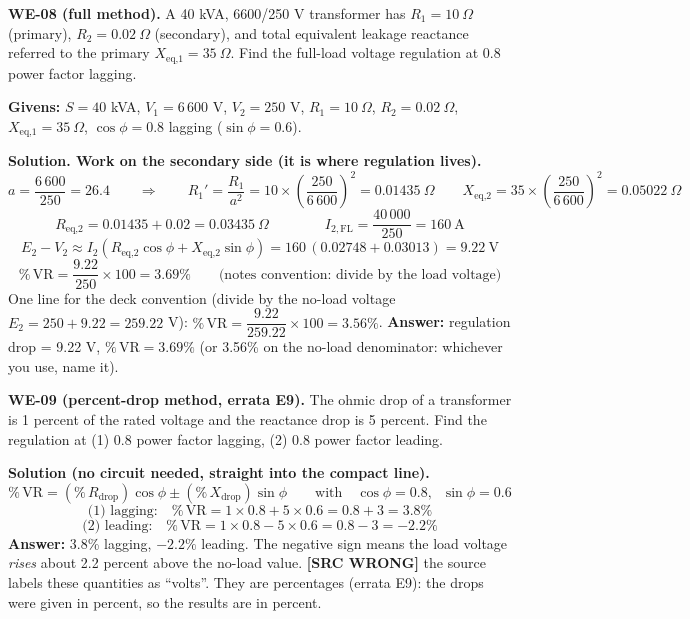 \documentclass[11pt]{article}
\newcommand{\tagline}[1]{\textbf{\color{copper}#1}}
\newcommand{\srcwrong}[1]{\textbf{\color{red}[SRC WRONG]} #1}
\begin{document}
\tagline{WE-08 (full method).} A 40 kVA, 6600/250 V transformer has $R_1 = 10\ \Omega$ (primary), $R_2 = 0.02\ \Omega$ (secondary), and total equivalent leakage reactance referred to the primary $X_{\text{eq,1}} = 35\ \Omega$. Find the full-load voltage regulation at 0.8 power factor lagging.

\textbf{Givens:} $S = 40$ kVA, $V_1 = 6\,600$ V, $V_2 = 250$ V, $R_1 = 10\ \Omega$, $R_2 = 0.02\ \Omega$, $X_{\text{eq,1}} = 35\ \Omega$, $\cos\phi = 0.8$ lagging ($\sin\phi = 0.6$).

\textbf{Solution. Work on the secondary side (it is where regulation lives).}
\[
a = \frac{6\,600}{250} = 26.4
\qquad\Longrightarrow\qquad
R_1' = \frac{R_1}{a^{2}} = 10 \times \left(\frac{250}{6\,600}\right)^{2} = 0.01435\ \Omega
\qquad
X_{\text{eq,2}} = 35 \times \left(\frac{250}{6\,600}\right)^{2} = 0.05022\ \Omega
\]
\[
R_{\text{eq,2}} = 0.01435 + 0.02 = 0.03435\ \Omega
\qquad\qquad
I_{2,\text{FL}} = \frac{40\,000}{250} = 160\ \text{A}
\]
\[
E_2 - V_2 \approx I_2\left(R_{\text{eq,2}}\cos\phi + X_{\text{eq,2}}\sin\phi\right) = 160\,(0.02748 + 0.03013) = 9.22\ \text{V}
\]
\[
\%\,\text{VR} = \frac{9.22}{250} \times 100 = 3.69\%
\qquad\text{(notes convention: divide by the load voltage)}
\]
One line for the deck convention (divide by the no-load voltage $E_2 = 250 + 9.22 = 259.22$ V): $\%\,\text{VR} = \dfrac{9.22}{259.22} \times 100 = 3.56\%$. \textbf{Answer:} regulation drop = 9.22 V, $\%\,\text{VR} = 3.69\%$ (or 3.56\% on the no-load denominator: whichever you use, name it).

\vspace{2pt}

\tagline{WE-09 (percent-drop method, errata E9).} The ohmic drop of a transformer is 1 percent of the rated voltage and the reactance drop is 5 percent. Find the regulation at (1) 0.8 power factor lagging, (2) 0.8 power factor leading.

\textbf{Solution (no circuit needed, straight into the compact line).}
\[
\%\,\text{VR} = \left(\%\,R_{\text{drop}}\right)\cos\phi \pm \left(\%\,X_{\text{drop}}\right)\sin\phi
\qquad\text{with}\quad \cos\phi = 0.8,\;\; \sin\phi = 0.6
\]
\[
\text{(1) lagging:}\quad \%\,\text{VR} = 1 \times 0.8 + 5 \times 0.6 = 0.8 + 3 = 3.8\%
\]
\[
\text{(2) leading:}\quad \%\,\text{VR} = 1 \times 0.8 - 5 \times 0.6 = 0.8 - 3 = -2.2\%
\]
\textbf{Answer:} 3.8\% lagging, $-2.2\%$ leading. The negative sign means the load voltage \emph{rises} about 2.2 percent above the no-load value. \srcwrong{the source labels these quantities as ``volts''. They are percentages (errata E9): the drops were given in percent, so the results are in percent.}
\end{document}

